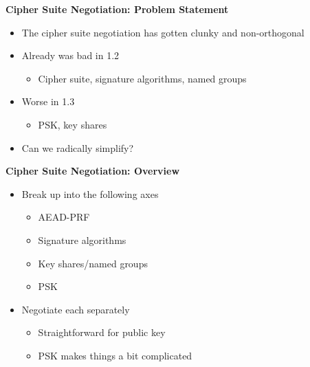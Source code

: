 \documentclass[helvetica]{seminar}
\newcommand{\heading}[1]{%
  \begin{center} 
    \large\bf 
    #1 
  \end{center} 
  \vspace{.4 in}}
\begin{document}
\begin{slide}
\heading{Cipher Suite Negotiation: Problem Statement}

\begin{itemize}
\item The cipher suite negotiation has gotten clunky and non-orthogonal
\item Already was bad in 1.2
  \begin{itemize}
  \item Cipher suite, signature algorithms, named groups
  \end{itemize}
\item Worse in 1.3 
  \begin{itemize}
  \item PSK, key shares
  \end{itemize}
\item Can we radically simplify?
\end{itemize}
\end{slide}

\begin{slide}
\heading{Cipher Suite Negotiation: Overview}

\begin{itemize}
\item Break up into the following axes
  \begin{itemize}
  \item AEAD-PRF
  \item Signature algorithms
  \item Key shares/named groups
  \item PSK
  \end{itemize}

\item Negotiate each separately
  \begin{itemize}
  \item Straightforward for public key
  \item PSK makes things a bit complicated
  \end{itemize}
\end{itemize}
\end{slide}
\end{document}
